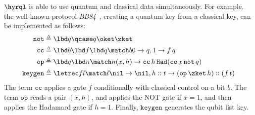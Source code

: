 \begin{example}
  \label{ex:hybrid-function}
  $\hyrql$ is able to use quantum and classical data simultaneously.
  For example, the well-known protocol \emph{BB84}~\cite{BB84}, creating
  a quantum key from a classical key, can be implemented as follows:
  \[
    \begin{aligned}
      \mathtt{not}&\triangleq \lbd q \qcase q \oket \zket \\
      \mathtt{cc} &\triangleq \lbd b \lbd f \lbd q \match b {
        0 \to q,
        1 \to f\,q
      } \\
      \mathtt{op} &\triangleq \lbd q \lbd n \match n {
        (x, h) \to
        \mathtt{cc}\,h\,\mathtt{Had}(\mathtt{cc}\,x\,\mathtt{not}\,q)
      } \\
      \mathtt{keygen} &\triangleq  \letrec f  l \match l {
        \nil \to \nil,
        h::t \to (\mathtt{op}\,\zket\,h) :: (f\,t)
      }
    \end{aligned}
  \]
  The term $\mathtt{cc}$ applies a gate $f$ conditionally with classical
  control on a bit $b$.
  The term $\mathtt{op}$ reads a pair $(x, h)$, and applies the NOT gate if
  $x = 1$, and then applies the Hadamard gate if $h = 1$. Finally,
  $\mathtt{keygen}$ generates the qubit list key.
\end{example}

